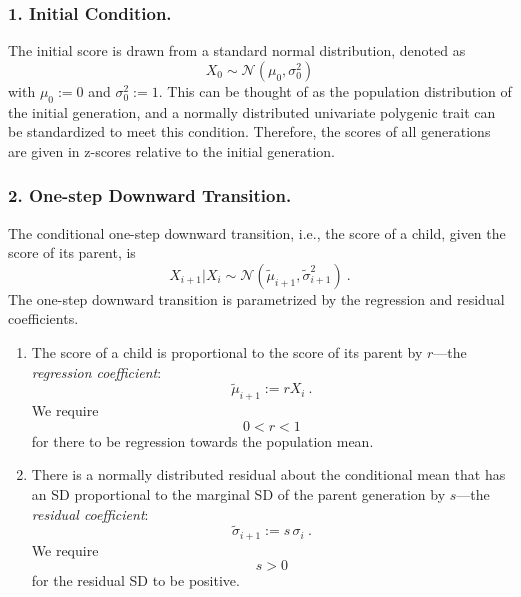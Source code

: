 \documentclass{svproc} %
\begin{document}
\subsubsection{1. Initial Condition.} 

The initial score is drawn from a standard normal distribution, denoted as
\begin{equation}
X_0 \sim \mathcal{N}(\mu_0, \sigma_0^2) 
\label{eq:initial_state}
\end{equation}
with $\mu_0 := 0$ and $\sigma_0^2 := 1$. This can be thought of as the population distribution of the initial generation, and a normally distributed univariate polygenic trait can be standardized to meet this condition. Therefore, the scores of all generations are given in z-scores relative to the initial generation. 

\subsubsection{2. One-step Downward Transition.}

The conditional one-step downward transition, i.e., the score of a child, given the score of its parent, is
\begin{equation}
X_{i+1}|X_i \sim \mathcal{N}(\tilde{\mu}_{i+1}, \tilde{\sigma}_{i+1}^2) \ . 
\label{eq:one_step}
\end{equation}
The one-step downward transition is parametrized by the regression and residual coefficients.

\begin{enumerate}
\item The score of a child is proportional to the score of its parent by $r$---the \emph{regression coefficient}:  
\begin{equation}
\tilde{\mu}_{i+1} := rX_i \ .
\label{eq:mu_tilde}
\end{equation}
We require
\begin{equation}
0 < r < 1
\label{eq:r_require}
\end{equation}
for there to be regression towards the population mean. 

\item There is a normally distributed residual about the conditional mean that has an SD proportional to the marginal SD of the parent generation by $s$---the \emph{residual coefficient}:
\begin{equation}
\tilde{\sigma}_{i+1} := s \, \sigma_i \ .
\label{eq:sigma_tilde}
\end{equation}
We require 
\begin{equation}
s > 0
\label{eq:s_require}
\end{equation}
for the residual SD to be positive.
\end{enumerate}
\end{document}
